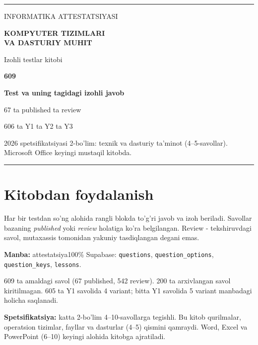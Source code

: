 \documentclass[10pt,a4paper]{article}
\begin{document}
\begin{titlepage}
\vspace*{27mm}
{\color{teal}\rule{\textwidth}{2pt}}\par
\vspace{21mm}
{\large\sffamily INFORMATIKA ATTESTATSIYASI }\par
\vspace{13mm}
{\fontsize{24}{30}\selectfont\bfseries\sffamily\color{ink}KOMPYUTER TIZIMLARI\\VA DASTURIY MUHIT}\par
\vspace{8mm}
{\large Izohli testlar kitobi}\par
\vspace{18mm}
{\Huge\bfseries\color{teal}609}\par
{\large\bfseries Test va uning tagidagi izohli javob}\par
\vspace{12mm}
67 ta published  ta review\par
606 ta Y1  ta Y2  ta Y3\par
\vfill
{\color{muted}2026 spetsifikatsiyasi 2-bo'lim: texnik va dasturiy ta'minot (4--5-savollar).\\
Microsoft Office keyingi mustaqil kitobda.}\par
\vspace{10mm}
{\color{teal}\rule{\textwidth}{2pt}}\par
\end{titlepage}
\section*{Kitobdan foydalanish}
Har bir testdan so'ng alohida rangli blokda to'g'ri javob va izoh beriladi.
Savollar bazaning \textit{published} yoki \textit{review} holatiga ko'ra belgilangan.
Review - tekshiruvdagi savol, mutaxassis tomonidan yakuniy tasdiqlangan degani emas.
\par\textbf{Manba:} attestatsiya100\% Supabase: \texttt{questions}, \texttt{question\_options},
\texttt{question\_keys}, \texttt{lessons}.
\par 609 ta amaldagi savol (67 published, 542 review). 200 ta arxivlangan savol kiritilmagan.
605 ta Y1 savolida 4 variant; bitta Y1 savolida 5 variant manbadagi holicha saqlanadi.
\par\textbf{Spetsifikatsiya:} katta 2-bo'lim 4--10-savollarga tegishli.
Bu kitob qurilmalar, operatsion tizimlar, fayllar va dasturlar (4--5) qismini qamraydi.
Word, Excel va PowerPoint (6--10) keyingi alohida kitobga ajratiladi.
\tableofcontents
\clearpage
\end{document}

